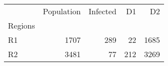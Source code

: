 \begin{tabular}{lrrrr}
\toprule
{} &  Population &  Infected &   D1 &    D2 \\
Regions &             &           &      &       \\
\midrule
R1      &        1707 &       289 &   22 &  1685 \\
R2      &        3481 &        77 &  212 &  3269 \\
\bottomrule
\end{tabular}
